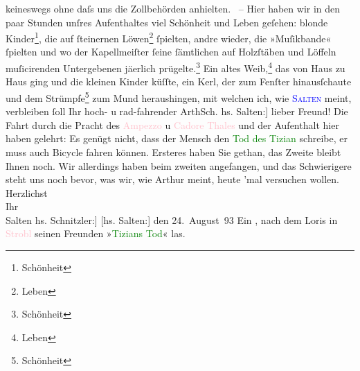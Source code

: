                keineswegs ohne daſs uns die Zollbehörden anhielten.  – Hier haben wir in den paar
               Stunden unſres Aufenthaltes viel Schönheit und Leben geſehen: blonde Kinder\footnote{\noindent{}Schönheit}, die auf ſteinernen Löwen\footnote{\noindent{}Leben}{ }ſpielten, andre wieder, die »Muſikbande« ſpielten
               und wo der Kapellmeiſter ſeine ſämtlichen auf {\pb}Holzſtäben
               und Löffeln muſicirenden Untergebenen jä{\geminationm}erlich
                  prügelte.\footnote{\noindent{}Schönheit} Ein altes Weib,\footnote{\noindent{}Leben} das von Haus zu Haus ging und die kleinen Kinder küſſte, ein Kerl, der
               zum Fenſter hinausſchaute und dem Strümpfe\footnote{\noindent{}Schönheit} zum Mund heraushingen, mit welchen ich, wie \textcolor{blue}{\textsc{Salten}}{}\ledrightnote{\textcolor{blue}{Felix Salten}} meint, verbleiben ſoll\pend
           \pstart Ihr hoch- u rad-fahrender \spacefill\mbox{ArthSch.}\pend{}\pstart
           \noindent{}{\pb}{[}hs. Salten:{]} lieber Freund! Die Fahrt durch die Pracht des \textcolor{pink}{Ampezzo}{}\ledrightnote{\textcolor{pink}{Valle d’Ampezzo}} u \textcolor{pink}{Cadore Thales}{}\ledrightnote{\textcolor{pink}{Valle di Cadore}} und
               der Aufenthalt hier haben gelehrt: Es genügt nicht, dass der Mensch den \textcolor{green}{Tod des Tizian}{}\ledrightnote{\textcolor{green}{Der Tod des Tizian}} schreibe, er muss auch Bicycle fahren
               können. Ersteres haben Sie gethan, das Zweite bleibt Ihnen noch. Wir allerdings haben
               beim zweiten angefangen, und das Schwierigere steht uns noch bevor, was wir, wie
               Arthur meint, heute ’mal versuchen wollen.\pend
           \pstart
           Herzlichst{\\}Ihr{\\}\spacefill\mbox{Salten}\pend
           \pstart
           \noindent{}{[}hs. Schnitzler:{]} \label{T_L00259_1v}\label{T_L00259_1h}\pend
           \pstart
           {[}hs. Salten:{]} den 24. August 93\pend
           \pstart
           Ein \label{K_L00259_1v}\label{K_L00259_1h}, nach dem Loris in \textcolor{pink}{Strobl}{}\ledrightnote{\textcolor{pink}{Strobl}} seinen Freunden
                  »\textcolor{green}{Tizians Tod}{}\ledrightnote{\textcolor{green}{Der Tod des Tizian}}« las.\pend
           \endnumbering{}  
      